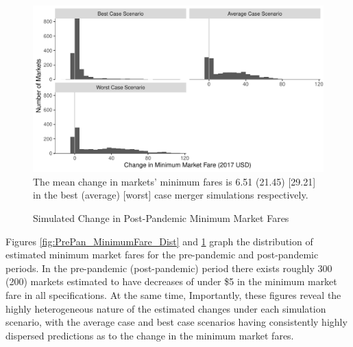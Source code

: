 \documentclass{article}
\begin{document}
    \begin{figure}
    \caption{Simulated Change in Post-Pandemic Minimum Market Fares}
    \includegraphics[width = \linewidth]{Merger_Change_MinimumFare_Dist}
    \label{fig:PostPan_MinimumFare_Dist}
    \footnotesize{The mean change in markets' minimum fares is 6.51 (21.45) [29.21] in the best (average) [worst] case merger simulations respectively.}  
    \end{figure}    

    Figures \ref{fig:PrePan_MinimumFare_Dist} and \ref{fig:PostPan_MinimumFare_Dist} graph the distribution of estimated minimum market fares for the pre-pandemic and post-pandemic periods. In the pre-pandemic (post-pandemic) period there exists roughly 300 (200) markets estimated to have decreases of under \$5 in the minimum market fare in all specifications. At the same time,  Importantly, these figures reveal the highly heterogeneous nature of the estimated changes under each simulation scenario, with the average case and best case scenarios having consistently highly dispersed predictions as to the change in the minimum market fares.   

\end{document}
